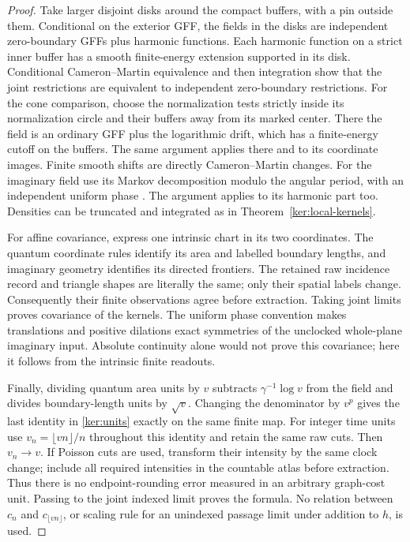 \documentclass[11pt]{article}
\numberwithin{equation}{section}
\theoremstyle{definition}
\theoremstyle{remark}
\newcommand{\1}{\mathbf 1}
\begin{document}
\begin{proof}
Take larger disjoint disks around the compact buffers, with a pin
outside them.  Conditional on the exterior GFF, the fields in the
disks are independent zero-boundary GFFs plus harmonic functions.
Each harmonic function on a strict inner buffer has a smooth
finite-energy extension supported in its disk.  Conditional
Cameron--Martin equivalence and then integration show that the joint
restrictions are equivalent to independent zero-boundary restrictions.
For the cone comparison, choose the normalization tests strictly
inside its normalization circle and their buffers away from its
marked center.  There the field is an ordinary GFF plus the
logarithmic drift, which has a finite-energy cutoff on the buffers.
The same argument applies there and to its coordinate images.  Finite smooth shifts are directly Cameron--Martin changes.
For the imaginary field use its Markov decomposition modulo the
angular period, with an independent uniform phase
\cite[Propositions~2.8, 2.9 and~2.11]{MillerSheffieldIGIV}.  The argument applies to
its harmonic part too.  Densities can be truncated and integrated as
in Theorem~\ref{ker:local-kernels}.

For affine covariance, express one intrinsic chart in its two
coordinates.  The quantum coordinate rules identify its area and
labelled boundary lengths, and imaginary geometry identifies its
directed frontiers.  The retained raw incidence record and triangle
shapes are literally the same; only their spatial labels change.
Consequently their finite observations agree before extraction.
Taking joint limits proves covariance of the kernels.  The uniform
phase convention makes translations and positive dilations exact
symmetries of the unclocked whole-plane imaginary input.  Absolute
continuity alone would not prove this covariance; here it follows
from the intrinsic finite readouts.

Finally, dividing quantum area units by \(v\) subtracts
\(\gamma^{-1}\log v\) from the field and divides boundary-length
units by \(\sqrt v\).  Changing the denominator by \(v^p\) gives the
last identity in \eqref{ker:units} exactly on the same finite map.
For integer time units use \(v_n=\lfloor vn\rfloor/n\) throughout
this identity and retain the same raw cuts.  Then \(v_n\to v\).
If Poisson cuts are used, transform their intensity by the same
clock change; include all required intensities in the countable
atlas before extraction.  Thus there is no endpoint-rounding error
measured in an arbitrary graph-cost unit.  Passing to the joint
indexed limit proves the formula.  No relation between \(c_n\) and
\(c_{\lfloor vn\rfloor}\), or scaling rule for an unindexed passage
limit under addition to \(h\), is used.
\end{proof}
\end{document}
